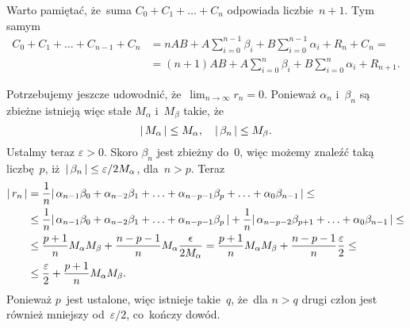 \documentclass[a4paper,11pt]{article}
\begin{document}
Warto pamiętać, że~suma $C_{ 0 } + C_{ 1 } + \ldots + C_{ n }$ odpowiada
liczbie~$n + 1$. Tym samym
\begin{equation}
  \label{eq:Leja-Funkcje-zespolone-27}
  \begin{split}
    C_{ 0 } + C_{ 1 } + \ldots + C_{ n - 1 } + C_{ n }
    &= n AB + A \sum_{ i = 0 }^{ n - 1 } \beta_{ i } + B \sum_{ i = 0 }^{ n - 1 }
      \alpha_{ i } + R_{ n } + C_{ n } = \\
    &= ( n + 1 ) AB + A \sum_{ i = 0 }^{ n } \beta_{ i } + B \sum_{ i = 0 }^{ n } \alpha_{ i }
      + R_{ n + 1 }.
  \end{split}
\end{equation}

\vspace{\spaceFour}





\noindent
{} Potrzebujemy jeszcze udowodnić, że~$\lim_{ n \to \infty } r_{ n } = 0$.
Ponieważ $\alpha_{ n }$ i~$\beta_{ n }$ są zbieżne istnieją więc stałe $M_{ \alpha }$
i~$M_{ \beta }$ takie, że
\begin{equation}
  \label{eq:Leja-Funkcje-zespolone-28}
  |\, {  M_{ \alpha }  } \,| \leq M_{ \alpha }, \quad |\, {  \beta_{ n }  } \,| \leq M_{ \beta }.
\end{equation}
Ustalmy teraz $\varepsilon > 0$. Skoro $\beta_{ n }$ jest zbieżny do~0, więc możemy
znaleźć taką liczbę~$p$,
iż~$|\, {  \beta_{ n }  } \,| \leq \varepsilon / 2 M_{ \alpha }$,
dla~$n > p$. Teraz
\begin{equation}
  \label{eq:Leja-Funkcje-zespolone-29}
  \begin{split}
    |\, {  r_{ n }  } \,|
    &=
      \frac{ 1 }{ n } |\, {  \alpha_{ n - 1 } \beta_{ 0 } + \alpha_{ n - 2 } \beta_{ 1 }
      + \ldots + \alpha_{ n - p - 1 } \beta_{ p } + \ldots + \alpha_{ 0 } \beta_{ n - 1 }  } \,| \leq \\
    &\leq \frac{ 1 }{ n } |\, {  \alpha_{ n - 1 } \beta_{ 0 } + \alpha_{ n - 2 } \beta_{ 1 }
      + \ldots + \alpha_{ n - p - 1 } \beta_{ p }  } \,| + \frac{ 1 }{ n }
      |\, {  \alpha_{ n - p - 2 } \beta_{ p + 1 } + \ldots + \alpha_{ 0 } \beta_{ n - 1 }  } \,| \leq \\
    &\leq \frac{ p + 1 }{ n } M_{ \alpha } M_{ \beta }
      + \frac{ n - p - 1 }{ n } M_{ \alpha } \frac{ \epsilon }{ 2 M_{ \alpha } }
      = \frac{ p + 1 }{ n } M_{ \alpha } M_{ \beta } + \frac{ n - p - 1 }{ n }
      \frac{ \varepsilon }{ 2 } \leq \\
    &\leq \frac{ \varepsilon }{ 2 } + \frac{ p + 1 }{ n } M_{ \alpha } M_{ \beta }.
  \end{split}
\end{equation}
Ponieważ $p$~jest ustalone, więc istnieje takie~$q$, że~dla $n > q$
drugi człon jest również mniejszy od~$\varepsilon / 2$, co~kończy dowód.
\end{document}
